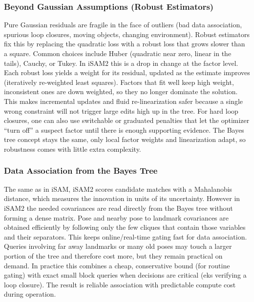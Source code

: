 \subsubsection{Beyond Gaussian Assumptions (Robust Estimators)}
Pure Gaussian residuals are fragile in the face of outliers (bad data association, spurious loop closures, moving objects, changing environment). Robust estimators fix this by replacing the quadratic loss with a robust loss that grows slower than a square. Common choices include Huber (quadratic near zero, linear in the tails), Cauchy, or Tukey. In iSAM2 this is a drop in change at the factor level. Each robust loss yields a weight for its residual, updated as the estimate improves (iteratively re-weighted least squares). Factors that fit well keep high weight, inconsistent ones are down weighted, so they no longer dominate the solution. This makes incremental updates and fluid re-linearization safer because a single wrong constraint will not trigger large edits high up in the tree. For hard loop closures, one can also use switchable or graduated penalties that let the optimizer ``turn off'' a suspect factor until there is enough supporting evidence. The Bayes tree concept stays the same, only local factor weights and linearization adapt, so robustness comes with little extra complexity.



\subsubsection{Data Association from the Bayes Tree}
The same as in iSAM, iSAM2 scores candidate matches with a Mahalanobis distance, which measures the innovation in units of its uncertainty. However in iSAM2 the needed covariances are read directly from the Bayes tree without forming a dense matrix. Pose and nearby pose to landmark covariances are obtained efficiently by following only the few cliques that contain those variables and their separators. This keeps online/real-time gating fast for data association. Queries involving far away landmarks or many old poses may touch a larger portion of the tree and therefore cost more, but they remain practical on demand. In practice this combines a cheap, conservative bound (for routine gating) with exact small block queries when decisions are critical (eks verifying a loop closure). The result is reliable association with predictable compute cost during operation.



